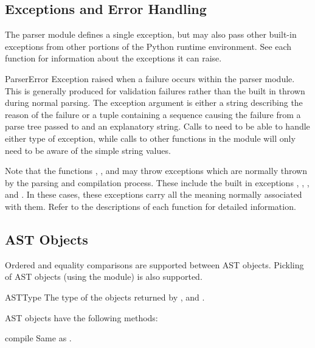 \subsection{Exceptions and Error Handling \label{AST Errors}}

The parser module defines a single exception, but may also pass other
built-in exceptions from other portions of the Python runtime
environment.  See each function for information about the exceptions
it can raise.

\begin{excdesc}{ParserError}
Exception raised when a failure occurs within the parser module.  This
is generally produced for validation failures rather than the built in
 thrown during normal parsing.
The exception argument is either a string describing the reason of the
failure or a tuple containing a sequence causing the failure from a parse
tree passed to  and an explanatory string.  Calls to
 need to be able to handle either type of exception,
while calls to other functions in the module will only need to be
aware of the simple string values.
\end{excdesc}

Note that the functions , , and
 may throw exceptions which are normally thrown by the
parsing and compilation process.  These include the built in
exceptions , ,
, and .  In these cases, these
exceptions carry all the meaning normally associated with them.  Refer
to the descriptions of each function for detailed information.


\subsection{AST Objects \label{AST Objects}}

Ordered and equality comparisons are supported between AST objects.
Pickling of AST objects (using the  module) is also
supported.

\begin{datadesc}{ASTType}
The type of the objects returned by ,
 and .
\end{datadesc}


AST objects have the following methods:


\begin{methoddesc}[AST]{compile}{}
Same as .
\end{methoddesc}

